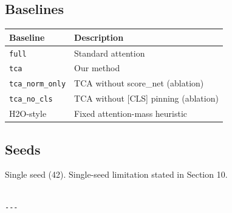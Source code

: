 \subsection{Baselines}

\begin{table}[H]
\centering
\small
\begin{tabular}{ll}
\toprule
\textbf{Baseline} & \textbf{Description} \\
\midrule
\texttt{full} & Standard attention \\
\texttt{tca} & Our method \\
\texttt{tca\_norm\_only} & TCA without score\_net (ablation) \\
\texttt{tca\_no\_cls} & TCA without [CLS] pinning (ablation) \\
H2O-style & Fixed attention-mass heuristic \\
\bottomrule
\end{tabular}
\end{table}

\subsection{Seeds}

Single seed (42). Single-seed limitation stated in Section 10.
\begin{lstlisting}

---
\end{lstlisting}